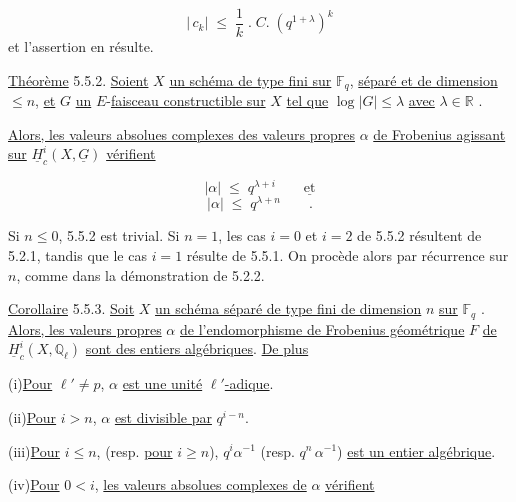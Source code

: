 \begin{equation*}
\left| \, c_k \right| \;\leqslant\; \frac{1}{k} \;.\; C. \; (q^{1+\lambda})^k
\end{equation*}
et l'assertion en résulte.

\underline{Théorème} 5.5.2. \underline{Soient} $X$ \underline{un schéma de type fini sur} $\mathbb{F}_q$, \underline{séparé et de dimension} $\leqslant n$, \underline{et} $G$ \underline{un} $E$-\underline{faisceau constructible sur} $X$ \underline{tel que} $\log|G| \leqslant \lambda$ \underline{avec} $\lambda \in \mathbb{R}$ .

\underline{Alors, les valeurs absolues complexes des valeurs propres} $\alpha$ \underline{de Frobenius agissant sur} $\underline{H}^i_c(X,\underline{G})$ \underline{vérifient}

\begin{equation*}
|\alpha| \;\leqslant\; q^{\lambda+i} \qquad \underline{\mbox{et}}
\end{equation*}
\begin{equation*}
|\alpha| \;\leqslant\; q^{\lambda+n} \qquad .
\end{equation*}


Si $n \leq 0$, 5.5.2 est trivial. Si $n = 1$, les cas $i = 0$ et $i = 2$ de 5.5.2 résultent de 5.2.1, tandis que le cas $i = 1$ résulte de 5.5.1. On procède alors par récurrence sur $n$, comme dans la démonstration de 5.2.2.

\underline{Corollaire} 5.5.3. \underline{Soit} $X$ \underline{un schéma séparé de type fini de dimension} $n$ \underline{sur} $\mathbb{F}_q$ . \underline{Alors, les valeurs propres} $\alpha$ \underline{de l'endomorphisme de Frobenius géométrique} $F$ \underline{de} $\underline{H}^i_c(X,\mathbb{Q}_\ell)$ \underline{sont des entiers algébriques}. \underline{De plus}

(i)\quad \underline{Pour} $\ell' \neq p$, $\alpha$ \underline{est une unité} $\ell'$\underline{-adique}.

(ii)\quad \underline{Pour} $i > n$, $\alpha$ \underline{est divisible par} $q^{i-n}$.

(iii)\quad \underline{Pour} $i \leq n$, (resp. \underline{pour} $i \geq n$), $q^i \alpha^{-1}$ (resp. $q^n \, \alpha^{-1}$) \underline{est un entier algébrique}.

(iv)\quad \underline{Pour} $0 < i$, \underline{les valeurs absolues complexes de} $\alpha$ \underline{vérifient}

